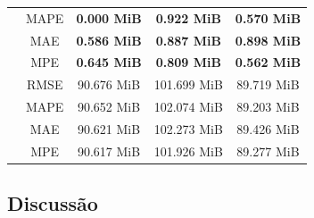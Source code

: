 \begin{table}[!htp]
\begin{tabular}{|c|c|ccc|}
        \rowcolor[HTML]{EFEFEF}
        \cellcolor[HTML]{C0C0C0}                          & MAPE                                              & \multicolumn{1}{c|}{\cellcolor[HTML]{EFEFEF}\textbf{0.000 MiB}} & \multicolumn{1}{c|}{\cellcolor[HTML]{EFEFEF}\textbf{0.922 MiB}} & \textbf{0.570 MiB} \\ \cline{2-5}
        \cellcolor[HTML]{C0C0C0}                          & MAE                                               & \multicolumn{1}{c|}{\textbf{0.586 MiB}}                         & \multicolumn{1}{c|}{\textbf{0.887 MiB}}                         & \textbf{0.898 MiB} \\ \cline{2-5}
        \rowcolor[HTML]{EFEFEF}
        \multirow{-4}{*}{\cellcolor[HTML]{C0C0C0}ReW}     & MPE                                               & \multicolumn{1}{c|}{\cellcolor[HTML]{EFEFEF}\textbf{0.645 MiB}} & \multicolumn{1}{c|}{\cellcolor[HTML]{EFEFEF}\textbf{0.809 MiB}} & \textbf{0.562 MiB} \\ \hline
        \cellcolor[HTML]{C0C0C0}                          & RMSE                                              & \multicolumn{1}{c|}{90.676 MiB}                                 & \multicolumn{1}{c|}{101.699 MiB}                                & 89.719 MiB         \\ \cline{2-5}
        \rowcolor[HTML]{EFEFEF}
        \cellcolor[HTML]{C0C0C0}                          & MAPE                                              & \multicolumn{1}{c|}{\cellcolor[HTML]{EFEFEF}90.652 MiB}         & \multicolumn{1}{c|}{\cellcolor[HTML]{EFEFEF}102.074 MiB}        & 89.203 MiB         \\ \cline{2-5}
        \cellcolor[HTML]{C0C0C0}                          & MAE                                               & \multicolumn{1}{c|}{90.621 MiB}                                 & \multicolumn{1}{c|}{102.273 MiB}                                & 89.426 MiB         \\ \cline{2-5}
        \rowcolor[HTML]{EFEFEF}
        \multirow{-4}{*}{\cellcolor[HTML]{C0C0C0}Prophet} & MPE                                               & \multicolumn{1}{c|}{\cellcolor[HTML]{EFEFEF}90.617 MiB}         & \multicolumn{1}{c|}{\cellcolor[HTML]{EFEFEF}101.926 MiB}        & 89.277 MiB         \\ \hline
    \end{tabular}
\end{table}
\subsection{Discussão}
